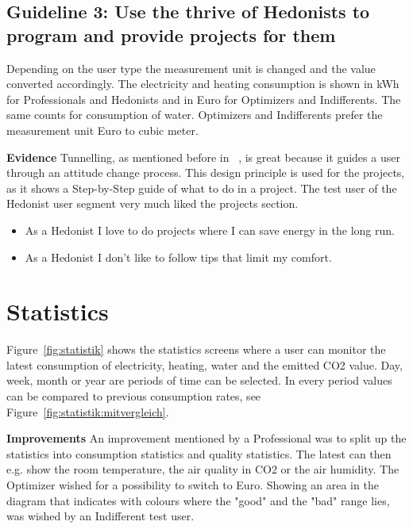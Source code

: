 \subsection*{Guideline 3: Use the thrive of Hedonists to program and provide projects for them}

Depending on the user type the measurement unit is changed and the value converted accordingly. The electricity and heating consumption is shown in kWh for Professionals and Hedonists and in Euro for Optimizers and Indifferents. The same counts for consumption of water. Optimizers and Indifferents prefer the measurement unit Euro to cubic meter.

\textbf{Evidence} \quad Tunnelling, as mentioned before in ~, is great because it guides a user through an attitude change process. This design principle is used for the projects, as it shows a Step-by-Step guide of what to do in a project. The test user of the Hedonist user segment very much liked the projects section.

\begin{itemize}
	\item As a Hedonist I love to do projects where I can save energy in the long run.
	\item As a Hedonist I don't like to follow tips that limit my comfort.
\end{itemize}

\section{Statistics}

Figure~\ref{fig:statistik} shows the statistics screens where a user can monitor the latest consumption of electricity, heating, water and the emitted CO2 value. Day, week, month or year are periods of time can be selected. In every period values can be compared to previous consumption rates, see Figure~\ref{fig:statistik:mitvergleich}.

\textbf{Improvements} \quad An improvement mentioned by a Professional was to split up the statistics into consumption statistics and quality statistics. The latest can then e.g. show the room temperature, the air quality in CO2 or the air humidity. The Optimizer wished for a possibility to switch to Euro. Showing an area in the diagram that indicates with colours where the "good" and the "bad" range lies, was wished by an Indifferent test user.

